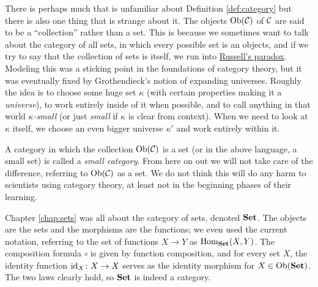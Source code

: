\documentclass[CT4S-EN-RU]{subfiles}
\begin{document}
\begin{definitionRUS}\label{def:category}
\end{definitionRUS}

\begin{remarkENG}\label{rmk:small}
There is perhaps much that is unfamiliar about Definition \ref{def:category} but there is also one thing that is strange about it. The objects $\textnormal{Ob}(\mathcal{C})$ of $\mathcal{C}$ are said to be a “collection” rather than a set. This is because we sometimes want to talk about the category of all sets, in which every possible set is an objects, and if we try to say that the collection of sets is itself, we run into \href{http://en.wikipedia.org/wiki/Russell's_paradox}{\text Russell's paradox}. Modeling this was a sticking point in the foundations of category theory, but it was eventually fixed by Grothendieck's notion of expanding universes. Roughly the idea is to choose some huge set $\kappa$ (with certain properties making it a {\em universe}), to work entirely inside of it when possible, and to call anything in that world {\em $\kappa$-small} (or just {\em small} if $\kappa$ is clear from context). When we need to look at $\kappa$ itself, we  choose an even bigger universe $\kappa'$ and work entirely within it.

A category in which the collection $\textnormal{Ob}(\mathcal{C})$ is a set (or in the above language, a small set) is called a {\em small category}. From here on out we will not take care of the difference, referring to $\textnormal{Ob}(\mathcal{C})$ as a set. We do not think this will do any harm to scientists using category theory, at least not in the beginning phases of their learning.
\end{remarkENG}

\begin{remarkRUS}\label{rmk:small}
\end{remarkRUS}

\begin{exampleENG}
Chapter \ref{chap:sets} was all about the category of sets, denoted ${\bf Set}$. The objects are the sets and the morphisms are the functions; we even used the current notation, referring to the set of functions $X\to Y$ as $\textnormal{Hom}_{\bf Set}(X,Y)$. The composition formula $\circ$ is given by function composition, and for every set $X$, the identity function $\textnormal{id}_X\colon X\rightarrow X$ serves as the identity morphism for $X\in\textnormal{Ob}({\bf Set})$. The two laws clearly hold, so ${\bf Set}$ is indeed a category. 
\end{exampleENG}
\end{document}
